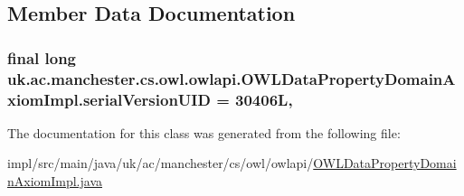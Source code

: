 \subsection{Member Data Documentation}
\hypertarget{classuk_1_1ac_1_1manchester_1_1cs_1_1owl_1_1owlapi_1_1_o_w_l_data_property_domain_axiom_impl_adeb05a9c80b9b5445517a4be308e9f20}{
\subsubsection[{serial\-Version\-U\-I\-D}]{\setlength{\rightskip}{0pt plus 5cm}final long uk.\-ac.\-manchester.\-cs.\-owl.\-owlapi.\-O\-W\-L\-Data\-Property\-Domain\-Axiom\-Impl.\-serial\-Version\-U\-I\-D = 30406\-L\hspace{0.3cm}{\ttfamily [static]}, {\ttfamily [private]}}}\label{classuk_1_1ac_1_1manchester_1_1cs_1_1owl_1_1owlapi_1_1_o_w_l_data_property_domain_axiom_impl_adeb05a9c80b9b5445517a4be308e9f20}


The documentation for this class was generated from the following file\-:\begin{DoxyCompactItemize}
\item 
impl/src/main/java/uk/ac/manchester/cs/owl/owlapi/\hyperlink{_o_w_l_data_property_domain_axiom_impl_8java}{O\-W\-L\-Data\-Property\-Domain\-Axiom\-Impl.\-java}\end{DoxyCompactItemize}
